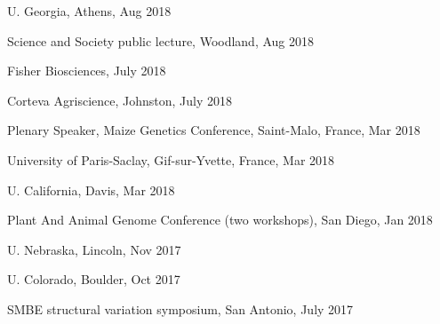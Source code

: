 \documentclass[letterpaper,10pt]{article}
\renewenvironment{itemize}{
  \begin{list}{}{
    \setlength{\leftmargin}{1.5em}
  }
}{
  \end{list}
}
\begin{document}
\begin{itemize}
\setlength\itemsep{0ex}
\item U. Georgia, Athens, Aug 2018
\item Science and Society public lecture, Woodland, Aug 2018
\item Fisher Biosciences, July 2018
\item Corteva Agriscience, Johnston, July 2018
\item Plenary Speaker, Maize Genetics Conference,  Saint-Malo, France, Mar 2018
\item University of Paris-Saclay, Gif-sur-Yvette, France, Mar 2018
\item U. California, Davis, Mar 2018
\item Plant And Animal Genome Conference (two workshops), San Diego, Jan 2018
\item U. Nebraska, Lincoln, Nov 2017
\item U. Colorado, Boulder, Oct 2017
\item SMBE structural variation symposium, San Antonio, July 2017

\end{itemize}
\end{document}

